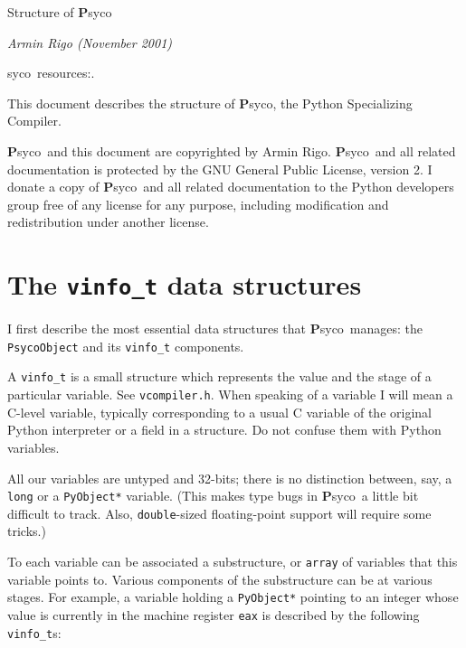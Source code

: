 \documentclass{article}
\def\Psyco{{\bf P}syco}
\def\code#1{\texttt{#1}}
\begin{document}
{\hfill\Large Structure of \Psyco \hfill}

\bigskip

{\hfill\it Armin Rigo \hfill (November 2001) \hfill}

\bigskip

\noindent\Psyco\ resources:\hfill\break {}.

\bigskip

This document describes the structure of \Psyco, the Python Specializing Compiler.

\bigskip

\Psyco\ and this document are copyrighted by Armin Rigo. \Psyco\ and all related documentation is protected by the GNU General Public License, version 2. I donate a copy of \Psyco\ and all related documentation to the Python developers group free of any license for any purpose, including modification and redistribution under another license.



\section{The \code{vinfo_t} data structures}


I first describe the most essential data structures that \Psyco\ manages: the \code{PsycoObject} and its \code{vinfo_t} components.

A \code{vinfo_t} is a small structure which represents the value and the stage of a particular variable. See \code{vcompiler.h}. When speaking of a variable I will mean a C-level variable, typically corresponding to a usual C variable of the original Python interpreter or a field in a structure. Do not confuse them with Python variables.

All our variables are untyped and 32-bits; there is no distinction between, say, a \code{long} or a \code{PyObject*} variable. (This makes type bugs in \Psyco\ a little bit difficult to track. Also, \code{double}-sized floating-point support will require some tricks.)

To each variable can be associated a substructure, or \code{array} of variables that this variable points to. Various components of the substructure can be at various stages. For example, a variable holding a \code{PyObject*} pointing to an integer whose value is currently in the machine register \code{eax} is described by the following \code{vinfo_t}s:
\end{document}
